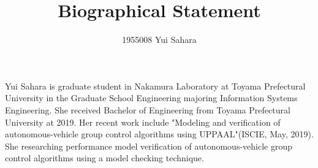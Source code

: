 \documentclass{article}
\title{Biographical Statement}
\author{1955008	Yui Sahara}
\date{}
\begin{document}
\maketitle

	Yui Sahara is graduate student in Nakamura Laboratory at Toyama Prefectural University in the Graduate School Engineering majoring Information Systems Engineering.  She received Bachelor of Engineering from Toyama Prefectural University at 2019.  Her recent work include "Modeling and verification of autonomous-vehicle group control algorithms using UPPAAL"(ISCIE, May, 2019).  She researching performance model verification of autonomous-vehicle group control algorithms using a model checking technique.
\end{document}
